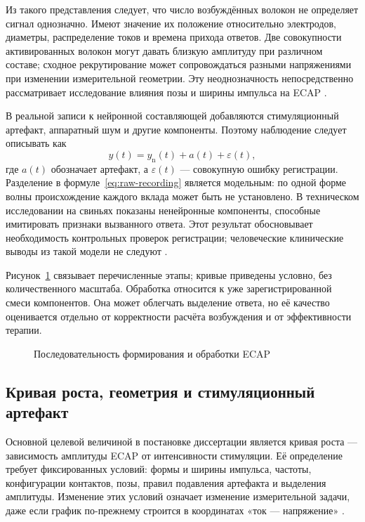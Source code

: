 Из такого представления следует, что число возбуждённых волокон не определяет сигнал однозначно. Имеют значение их положение относительно электродов, диаметры, распределение токов и времена прихода ответов. Две совокупности активированных волокон могут давать близкую амплитуду при различном составе; сходное рекрутирование может сопровождаться разными напряжениями при изменении измерительной геометрии. Эту неоднозначность непосредственно рассматривает исследование влияния позы и ширины импульса на ECAP \cite{posture}.

В реальной записи к нейронной составляющей добавляются стимуляционный артефакт, аппаратный шум и другие компоненты. Поэтому наблюдение следует описывать как
\begin{equation}
 y(t)=y_{\mathrm n}(t)+a(t)+\varepsilon(t),
 \label{eq:raw-recording}
\end{equation}
где $a(t)$ обозначает артефакт, а $\varepsilon(t)$ --- совокупную ошибку регистрации. Разделение в формуле~\eqref{eq:raw-recording} является модельным: по одной форме волны происхождение каждого вклада может быть не установлено. В техническом исследовании на свиньях показаны ненейронные компоненты, способные имитировать признаки вызванного ответа. Этот результат обосновывает необходимость контрольных проверок регистрации; человеческие клинические выводы из такой модели не следуют \cite{s798}.

Рисунок~\ref{fig:ecap-formation} связывает перечисленные этапы; кривые приведены условно, без количественного масштаба. Обработка относится к уже зарегистрированной смеси компонентов. Она может облегчать выделение ответа, но её качество оценивается отдельно от корректности расчёта возбуждения и от эффективности терапии.

\begin{figure}[htbp]
\centering

\caption{Последовательность формирования и обработки ECAP}
\label{fig:ecap-formation}
\end{figure}
\FloatBarrier

\subsection{Кривая роста, геометрия и стимуляционный артефакт}

Основной целевой величиной в постановке диссертации является кривая роста --- зависимость амплитуды ECAP от интенсивности стимуляции. Её определение требует фиксированных условий: формы и ширины импульса, частоты, конфигурации контактов, позы, правил подавления артефакта и выделения амплитуды. Изменение этих условий означает изменение измерительной задачи, даже если график по-прежнему строится в координатах «ток --- напряжение» \cite{posture,s787}.


